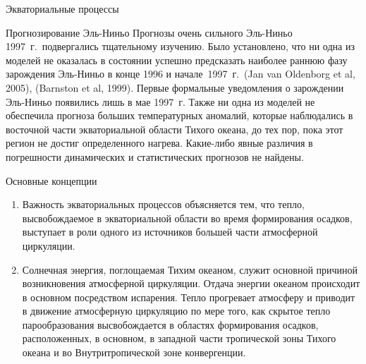\begin{chapter}{Экваториальные процессы}
\begin{section}{Прогнозирование Эль-Ниньо}
Прогнозы очень сильного Эль-Ниньо 1997~г.\ подвергались тщательному изучению.
Было установлено, что ни одна из моделей не оказалась в состоянии успешно
предсказать наиболее раннюю фазу зарождения Эль-Ниньо в конце 1996 и 
начале~1997~г.\ (Jan van Oldenborg et al, 2005), (Barnston et al, 1999).
Первые формальные уведомления о зарождении Эль-Ниньо появились лишь 
в мае 1997~г. Также ни одна из моделей не обеспечила прогноза больших
температурных аномалий, которые наблюдались в восточной части экваториальной
области Тихого океана, до тех пор, пока этот регион не достиг определенного
нагрева. Какие-либо явные различия в погрешности динамических и 
статистических прогнозов не найдены.
%
\end{section}

\begin{section}{Основные концепции}
\begin{enumerate}
\item
Важность экваториальных процессов объясняется тем, что тепло, высвобождаемое
в экваториальной области во время формирования осадков, выступает в роли
одного из источников большей части атмосферной циркуляции.
%

\item
Солнечная энергия, поглощаемая Тихим океаном, служит основной причиной
возникновения атмосферной циркуляции. Отдача энергии океаном
происходит в основном посредством испарения. Тепло прогревает атмосферу 
и приводит в движение атмосферную циркуляцию по мере того, как скрытое тепло 
парообразования высвобождается в областях формирования осадков, расположенных,
в основном, в западной части тропической зоны Тихого океана и во 
Внутритропической зоне конвергенции.
%


\end{enumerate}
\end{section}
\end{chapter}
